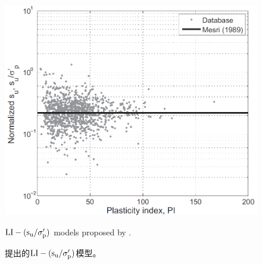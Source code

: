 \begin{figure}[!p]
\begin{minipage}[t]{0.48\textwidth}
        \includegraphics[width=\textwidth]{figures/figure-9.png}
        \caption{$\rm{LI}-(s_u/\sigma_p')$ models proposed by \citet{Mesri1975409, Mesri1989162}.}
        \vspace{-5pt}
        \addtocounter{figure}{-1}
        \renewcommand{\figurename}{图}
        \caption{\citet{Mesri1975409, Mesri1989162}提出的$\rm{LI}-(s_u/\sigma_p')$模型。}
        \renewcommand{\figurename}{Figure}
    \end{minipage}
\end{figure}

